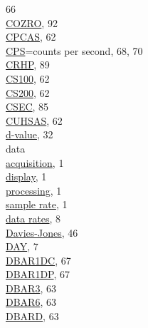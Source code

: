 \documentclass[
  english,
]{book}
\begin{document}
66\\
\href{./10-obsolete-variables.html\#co-vars}{COZRO}, 92\\
\href{./5-cloud-physics-variables.html\#size-distribution}{CPCAS}, 62\\
\href{./5-cloud-physics-variables.html\#a1dc-a1dp}{CPS}=counts per
second, 68, 70\\
\href{./10-obsolete-variables.html\#cryo-hygro}{CRHP}, 89\\
\href{./5-cloud-physics-variables.html\#size-distribution}{CS100}, 62\\
\href{./5-cloud-physics-variables.html\#size-distribution}{CS200}, 62\\
\href{./10-obsolete-variables.html\#loranc}{CSEC}, 85\\
\href{./5-cloud-physics-variables.html\#size-distribution}{CUHSAS}, 62\\
\href{./4-the-state-of-the-atmosphere.html\#dvalue}{d-value}, 32\\
data\\
\hspace*{0.333em}\hspace*{0.333em}\href{./1-introduction.html}{acquisition},
1\\
\hspace*{0.333em}\hspace*{0.333em}\href{./1-introduction.html}{display},
1\\
\hspace*{0.333em}\hspace*{0.333em}\href{./1-introduction.html}{processing},
1\\
\hspace*{0.333em}\hspace*{0.333em}\href{./1-introduction.html}{sample
rate}, 1\\
\href{./1-introduction.html}{data rates}, 8\\
\href{./4-the-state-of-the-atmosphere.html\#thetae}{Davies-Jones}, 46\\
\href{./2-general-information-about-data-files.html\#mdy\%7C}{DAY}, 7\\
\href{./5-cloud-physics-variables.html\#dbar2d}{DBAR1DC}, 67\\
\href{./5-cloud-physics-variables.html\#dbar2d}{DBAR1DP}, 67\\
\href{./5-cloud-physics-variables.html\#mean-diameter}{DBAR3}, 63\\
\href{./5-cloud-physics-variables.html\#mean-diameter}{DBAR6}, 63\\
\href{./5-cloud-physics-variables.html\#mean-diameter}{DBARD}, 63\\
\end{document}
